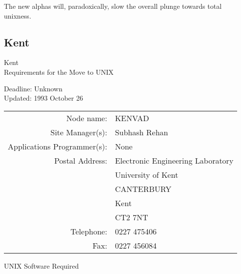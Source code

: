 The new alphas will, paradoxically, slow the overall plunge towards total
unixness.


\newpage
\subsection{Kent}

\renewcommand{\starsitename}{Kent}
\renewcommand{\starnodename}{KENVAD}

\renewcommand{\starunixdate}{Unknown}
\renewcommand{\starupdate}{1993 October 26}

\renewcommand{\starsitetelephone}{0227 475406}
\renewcommand{\starsitefax}{0227 456084}

\begin{center}
{\Large\sc \starsitename \\ [2ex]
           Requirements for the Move to UNIX}

\vspace{3mm}
{\large\sc Deadline: \starunixdate \\ [1ex]
           Updated: \starupdate}
\end{center}

\vspace{5mm}

\begin{center}
\begin{tabular}{rl}
{\sc Node name:}                  & \starnodename \\
{\sc Site Manager(s):}            & Subhash Rehan \\
{\sc Applications Programmer(s):} & None \\
{\sc Postal Address:}             & Electronic Engineering Laboratory \\
                                  & University of Kent \\
                                  & CANTERBURY \\
                                  & Kent \\
                                  & CT2 7NT \\
{\sc Telephone:}                  & \starsitetelephone \\
{\sc Fax:}                        & \starsitefax \\
\end{tabular}
\end{center}

\vspace{5mm}
\begin{center}
{\large\sc UNIX Software Required}
\end{center}


